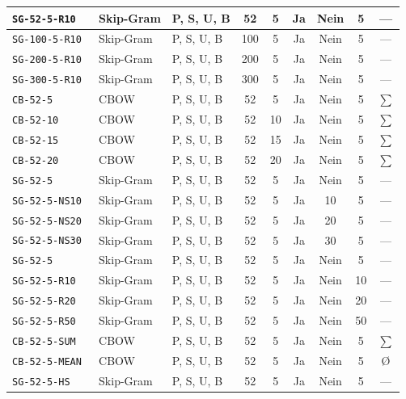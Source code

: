 \begin{table}[!ht]
\begin{tabular}{|l|l|l|c|c|c|c|c|c|}
\tt{SG-52-5-R10}  & Skip-Gram & P, S, U, B & 52  & 5  & Ja   & Nein & 5  & ---    \\ \hline
\tt{SG-100-5-R10} & Skip-Gram & P, S, U, B & 100 & 5  & Ja   & Nein & 5  & ---    \\ \hline
\tt{SG-200-5-R10} & Skip-Gram & P, S, U, B & 200 & 5  & Ja   & Nein & 5  & ---    \\ \hline\rowcolor{lightgreen}
\tt{SG-300-5-R10} & Skip-Gram & P, S, U, B & 300 & 5  & Ja   & Nein & 5  & ---    \\ \hline\hline
\tt{CB-52-5}      & CBOW      & P, S, U, B & 52  & 5  & Ja   & Nein & 5  & $\sum$ \\ \hline\rowcolor{lightgreen}
\tt{CB-52-10}     & CBOW      & P, S, U, B & 52  & 10 & Ja   & Nein & 5  & $\sum$ \\ \hline
\tt{CB-52-15}     & CBOW      & P, S, U, B & 52  & 15 & Ja   & Nein & 5  & $\sum$ \\ \hline
\tt{CB-52-20}     & CBOW      & P, S, U, B & 52  & 20 & Ja   & Nein & 5  & $\sum$ \\ \hline\hline
\tt{SG-52-5}      & Skip-Gram & P, S, U, B & 52  & 5  & Ja   & Nein & 5  & ---    \\ \hline\rowcolor{lightgreen}
\tt{SG-52-5-NS10} & Skip-Gram & P, S, U, B & 52  & 5  & Ja   & 10   & 5  & ---    \\ \hline
\tt{SG-52-5-NS20} & Skip-Gram & P, S, U, B & 52  & 5  & Ja   & 20   & 5  & ---    \\ \hline
\tt{SG-52-5-NS30} & Skip-Gram & P, S, U, B & 52  & 5  & Ja   & 30   & 5  & ---    \\ \hline\hline
\tt{SG-52-5}      & Skip-Gram & P, S, U, B & 52  & 5  & Ja   & Nein & 5  & ---    \\ \hline
\tt{SG-52-5-R10}  & Skip-Gram & P, S, U, B & 52  & 5  & Ja   & Nein & 10 & ---    \\ \hline
\tt{SG-52-5-R20}  & Skip-Gram & P, S, U, B & 52  & 5  & Ja   & Nein & 20 & ---    \\ \hline\rowcolor{lightgreen}
\tt{SG-52-5-R50}  & Skip-Gram & P, S, U, B & 52  & 5  & Ja   & Nein & 50 & ---    \\ \hline\hline
\tt{CB-52-5-SUM}  & CBOW      & P, S, U, B & 52  & 5  & Ja   & Nein & 5  & $\sum$ \\ \hline
\tt{CB-52-5-MEAN} & CBOW      & P, S, U, B & 52  & 5  & Ja   & Nein & 5  & \O     \\ \hline\rowcolor{lightgreen}
\tt{SG-52-5-HS}   & Skip-Gram & P, S, U, B & 52  & 5  & Ja   & Nein & 5  & ---    \\ \hline

\end{tabular}
\end{table}
